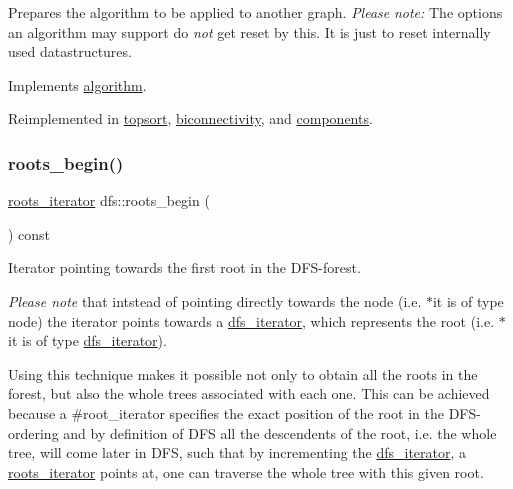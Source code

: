 Prepares the algorithm to be applied to another graph. {\itshape Please} {\itshape note\+:} The options an algorithm may support do {\itshape not} get reset by this. It is just to reset internally used datastructures. 

Implements \mbox{\hyperlink{classalgorithm_a21aba63d066ae7897de6ca7d8425c408}{algorithm}}.



Reimplemented in \mbox{\hyperlink{classtopsort_af93d2f617ceae83ee2a4f9106fbc32c3}{topsort}}, \mbox{\hyperlink{classbiconnectivity_a4393dd1e626887472f6967722349abc6}{biconnectivity}}, and \mbox{\hyperlink{classcomponents_a07b6bab5962524ae26ccb478b35cd76c}{components}}.

\mbox{\label{classdfs_af56fa2b736f0b924dba1257e18ba4b61}} 
\subsubsection{\texorpdfstring{roots\+\_\+begin()}{roots\_begin()}}
{\footnotesize\ttfamily \mbox{\hyperlink{classdfs_a17cb59c8a1fead11fa6b0c85cf5a478e}{roots\+\_\+iterator}} dfs\+::roots\+\_\+begin (\begin{DoxyParamCaption}{ }\end{DoxyParamCaption}) const\hspace{0.3cm}{\ttfamily [inline]}}



Iterator pointing towards the first root in the D\+F\+S-\/forest. 

{\itshape Please note} that intstead of pointing directly towards the node (i.\+e. {\ttfamily $\ast$it} is of type node) the iterator points towards a \mbox{\hyperlink{classdfs_ad040ddae37492e18c8e029406d667bd9}{dfs\+\_\+iterator}}, which represents the root (i.\+e. {\ttfamily $\ast$it} is of type \mbox{\hyperlink{classdfs_ad040ddae37492e18c8e029406d667bd9}{dfs\+\_\+iterator}}).

Using this technique makes it possible not only to obtain all the roots in the forest, but also the whole trees associated with each one. This can be achieved because a \#root\+\_\+iterator specifies the exact position of the root in the D\+F\+S-\/ordering and by definition of D\+FS all the descendents of the root, i.\+e. the whole tree, will come later in D\+FS, such that by incrementing the \mbox{\hyperlink{classdfs_ad040ddae37492e18c8e029406d667bd9}{dfs\+\_\+iterator}}, a \mbox{\hyperlink{classdfs_a17cb59c8a1fead11fa6b0c85cf5a478e}{roots\+\_\+iterator}} points at, one can traverse the whole tree with this given root.

